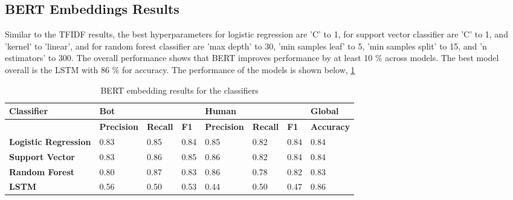 \documentclass[12pt]{article}
\begin{document}
\subsection{BERT Embeddings Results}
Similar to the TFIDF results, the best hyperparameters for logistic regression are 'C'  to 1, for support vector classifier are 'C' to 1, and 'kernel' to 'linear', and for random forest classifier are 'max depth' to 30, 'min samples leaf' to 5, 'min samples split' to 15, and 'n estimators' to 300. The overall performance shows that BERT improves performance by at least 10 \% across models.  The best model overall is the LSTM with 86 \% for accuracy. The performance of the models is shown below, \ref{table:bert}
\begin{table}[ht]
\begin{tabular}{|l|lll|lll|l|}
\hline
\textbf{Classifier}          & \multicolumn{3}{l|}{\textbf{Bot	}}                                                          & \multicolumn{3}{l|}{\textbf{Human}}                                                            & \textbf{Global}   \\ \hline
\textbf{}                    & \multicolumn{1}{l|}{\textbf{Precision}} & \multicolumn{1}{l|}{\textbf{Recall}} & \textbf{F1} & \multicolumn{1}{l|}{\textbf{Precision}} & \multicolumn{1}{l|}{\textbf{Recall}} & \textbf{F1} & \textbf{Accuracy} \\ \hline
\textbf{Logistic Regression} & \multicolumn{1}{l|}{0.83}               & \multicolumn{1}{l|}{0.85}            & 0.84        & \multicolumn{1}{l|}{0.85}               & \multicolumn{1}{l|}{0.82}            & 0.84        & 0.84              \\ \hline
\textbf{Support Vector}      & \multicolumn{1}{l|}{0.83}               & \multicolumn{1}{l|}{0.86}            & 0.85        & \multicolumn{1}{l|}{0.86}               & \multicolumn{1}{l|}{0.82}            & 0.84        & 0.84              \\ \hline
\textbf{Random Forest}       & \multicolumn{1}{l|}{0.80}               & \multicolumn{1}{l|}{0.87}            & 0.83        & \multicolumn{1}{l|}{0.86}               & \multicolumn{1}{l|}{0.78}            & 0.82        & 0.83              \\ \hline
\textbf{LSTM}                & \multicolumn{1}{l|}{0.56}                   & \multicolumn{1}{l|}{0.50}                &0.53             & \multicolumn{1}{l|}{0.44}                   & \multicolumn{1}{l|}{0.50}                &0.47            & 0.86              \\ \hline
\end{tabular}
\caption{BERT embedding results for the classifiers}
\label{table:bert}
\end{table}
\end{document}
